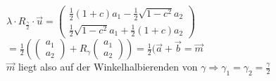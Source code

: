 $\lambda \cdot R_{\frac{\gamma}{2}} \cdot \vec{u} = \begin{pmatrix} \frac{1}{2} (1+c)a_{1} -\frac{1}{2}\sqrt{1-c^{2}}a_{2} \\ \frac{1}{2}\sqrt{1-c^{2}}a_{1} + \frac{1}{2}(1+c)a_{2}\end{pmatrix}$\\
$= \frac{1}{2}(\begin{pmatrix}a_{1} \\ a_{2} \end{pmatrix} + R_{\gamma} \begin{pmatrix} a_{1} \\ a_{2} \end{pmatrix} ) = \frac{1}{2}(\vec{a}+\vec{b}=\vec{m}$\\
$\vec{m}$ liegt also auf der Winkelhalbierenden von $\gamma \Rightarrow \gamma_{1} = \gamma_{2} = \frac{\gamma}{2}$
